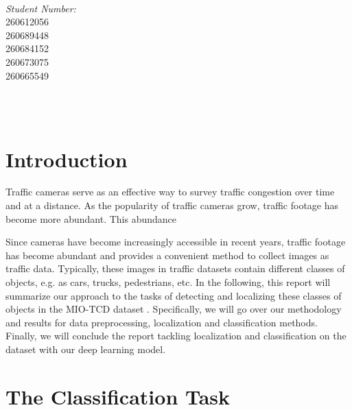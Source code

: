 \documentclass[12pt]{article}
\makeatletter
\let\thedate\@date
\makeatother
\begin{document}
\begin{titlepage}
\begin{minipage}{0.4\textwidth}
\begin{flushleft}
            \end{flushleft}
            \end{minipage}~
            \begin{minipage}{0.4\textwidth}
            \begin{flushright} \large
            \emph{Student Number:} \\
            260612056 \\ 
            260689448 \\ 
            260684152 \\ 
            260673075 \\ 
            260665549  %
        \end{flushright}
    \end{minipage}\\[2 cm]
 
    {\large \thedate}\\[2 cm]
 
    \vfill
    
\end{titlepage}


\section{Introduction}
 Traffic cameras serve as an effective way to survey traffic congestion over time and at a distance. As the popularity of traffic cameras grow, traffic footage has become more abundant. This abundance 


 Since cameras have become increasingly accessible in recent years, traffic footage has become abundant and provides a convenient method to collect images as traffic data. Typically, these images in traffic datasets contain different classes of objects, e.g. as cars, trucks, pedestrians, etc. In the following, this report will summarize our approach to the tasks of detecting and localizing these classes of objects in the MIO-TCD dataset \cite{MIO_TCD}. Specifically, we will go over our methodology and results for data preprocessing, localization and classification methods. Finally, we will conclude the report tackling localization and classification on the dataset with our deep learning model. 

\section{The Classification Task}
\end{document}
